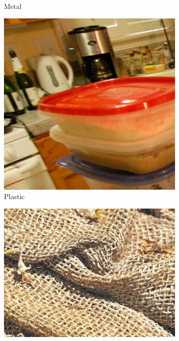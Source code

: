 \documentclass[12pt,a4paper]{article}
\begin{document}
\begin{figure}
\begin{subfigure}[c]{0.23\linewidth}
			\caption{Metal}
			\vspace{5mm}
		\end{subfigure}
		\begin{subfigure}[c]{0.23\linewidth}
			\includegraphics[width=\linewidth]{./imgs/minc4}
			\caption{Plastic}
			\vspace{5mm}
		\end{subfigure}
		\begin{subfigure}[c]{0.23\linewidth}
			\includegraphics[width=\linewidth]{./imgs/fmd1}

\end{subfigure}
\end{figure}
\end{document}
